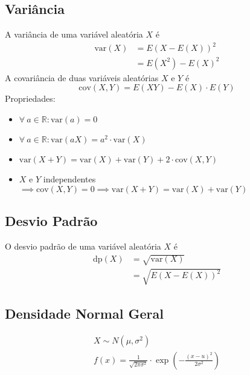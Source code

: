 \documentclass{article}
\begin{document}
\subsection{Variância}
A variância de uma variável aleatória $X$ é
\begin{align*}
  \text{var}(X) & = {E(X - E(X))}^2 \\
  & = E(X^2) - {E(X)}^2
\end{align*}
A covariância de duas variáveis aleatórias $X$ e $Y$ é
\[ \text{cov}(X, Y) = E(XY) - E(X) \cdot E(Y) \]
Propriedades:
\begin{itemize}
  \item $\forall\: a \in \mathbb{R}: \text{var}(a) = 0$
  \item $\forall\: a \in \mathbb{R}: \text{var}(aX) = a^2 \cdot \text{var}(X)$
  \item $\text{var}(X + Y) = \text{var}(X) + \text{var}(Y) + 2 \cdot \text{cov}(X, Y)$
  \item $X$ e $Y$ independentes $\implies \text{cov}(X,Y) = 0 \implies \text{var}(X + Y) = \text{var}(X) + \text{var}(Y)$
\end{itemize}

\subsection{Desvio Padrão}
O desvio padrão de uma variável aleatória $X$ é
\begin{align*}
  \text{dp}(X) & = \sqrt{\text{var}(X)} \\
  & = \sqrt{{E(X - E(X))}^2}
\end{align*}

\pagebreak

\subsection{Densidade Normal Geral}
\begin{gather*}
  X \sim N(\mu, \sigma^2) \\[5pt]
  f(x) = \frac{1}{\sqrt{2 \pi \sigma^2}} \cdot \exp \left(- \frac{{(x - u)}^2}{2\sigma^2} \right)
\end{gather*}
\end{document}
